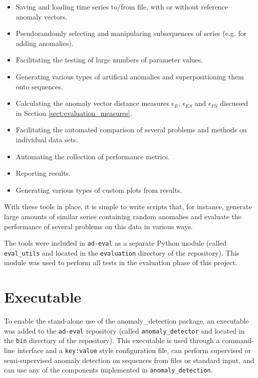\begin{itemize}
    \item Saving and loading time series to/from file, with or without reference anomaly vectors.
    \item Pseudorandomly selecting and manipularing subsequences of series (e.g. for adding anomalies).
    \item Facilitating the testing of large numbers of parameter values.
    \item Generating various types of artificial anomalies and superpositioning them onto sequences.
    \item Calculating the anomaly vector distance measures $\epsilon_E$, $\epsilon_{ES}$ and $\epsilon_{FS}$ discussed in Section \ref{sect:evaluation_measures}.
    \item Facilitating the automated comparison of several problems and methods on individual data sets.
    \item Automating the collection of performance metrics.
    \item Reporting results.
    \item Generating various types of custom plots from results.
\end{itemize}

With these tools in place, it is simple to write scripts that, for instance, generate large amounts of similar series containing random anomalies and evaluate the performance of several problems on this data in various ways. 

The tools were included in \texttt{ad-eval} as a separate Python module (called \texttt{eval\_utils} and located in the \texttt{evaluation} directory of the repository). This module was used to perform all tests in the evaluation phase of this project.

\section{Executable}
\label{sect:executable}

To enable the stand-alone use of the anomaly\_detection package, an executable was added to the \texttt{ad-eval} repository (called \texttt{anomaly\_detector} and located in the \texttt{bin} directory of the repository). This executable is used through a command-line interface and a \texttt{key:value} style configuration file, can perform supervised or semi-supervised anomaly detection on sequences from files or standard input, and can use any of the components implemented in \texttt{anomaly\_detection}.

